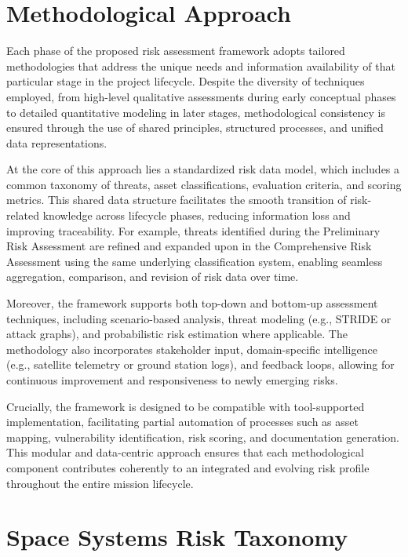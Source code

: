 \documentclass[binding=0.6cm]{sapthesis}
\begin{document}
\section{Methodological Approach}

Each phase of the proposed risk assessment framework adopts tailored methodologies that address the unique needs and information availability of that particular stage in the project lifecycle. Despite the diversity of techniques employed, from high-level qualitative assessments during early conceptual phases to detailed quantitative modeling in later stages, methodological consistency is ensured through the use of shared principles, structured processes, and unified data representations.

At the core of this approach lies a standardized risk data model, which includes a common taxonomy of threats, asset classifications, evaluation criteria, and scoring metrics. This shared data structure facilitates the smooth transition of risk-related knowledge across lifecycle phases, reducing information loss and improving traceability. For example, threats identified during the Preliminary Risk Assessment are refined and expanded upon in the Comprehensive Risk Assessment using the same underlying classification system, enabling seamless aggregation, comparison, and revision of risk data over time.

Moreover, the framework supports both top-down and bottom-up assessment techniques, including scenario-based analysis, threat modeling (e.g., STRIDE or attack graphs), and probabilistic risk estimation where applicable. The methodology also incorporates stakeholder input, domain-specific intelligence (e.g., satellite telemetry or ground station logs), and feedback loops, allowing for continuous improvement and responsiveness to newly emerging risks.

Crucially, the framework is designed to be compatible with tool-supported implementation, facilitating partial automation of processes such as asset mapping, vulnerability identification, risk scoring, and documentation generation. This modular and data-centric approach ensures that each methodological component contributes coherently to an integrated and evolving risk profile throughout the entire mission lifecycle.

\section{Space Systems Risk Taxonomy}
\end{document}
